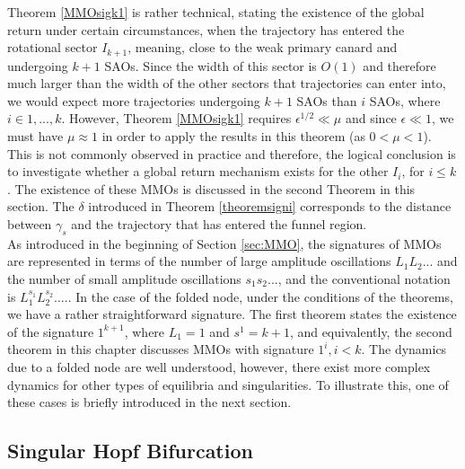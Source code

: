 Theorem \ref{MMOsigk1} is rather technical, stating the existence of the global return under certain circumstances, when the trajectory has entered the rotational sector $I_{k+1}$, meaning, close to the weak primary canard and undergoing $k+1$ SAOs. Since the width of this sector is $O(1)$ and therefore much larger than the width of the other sectors that trajectories can enter into, we would expect more trajectories undergoing $k+1$ SAOs than $i$ SAOs, where $i \in 1,...,k$.
However, Theorem \ref{MMOsigk1} requires $\epsilon^{1/2} \ll \mu$ and since $\epsilon \ll 1$, we must have $\mu \approx 1$ in order to apply the results in this theorem (as $0<\mu<1$). This is not commonly observed in practice and therefore, the logical conclusion is to investigate whether a global return mechanism exists for the other $I_i$, for $i \leq k$. The existence of these MMOs is discussed in the second Theorem in this section. The $\delta$ introduced in Theorem \ref{theoremsigni} corresponds to the distance between
$\gamma_s$ and the trajectory that has entered the funnel region.\\

As introduced in the beginning of Section \ref{sec:MMO},  the signatures of MMOs are represented in terms of the number of large amplitude oscillations $L_1L_2...$ and the number of small amplitude oscillations $s_1s_2...$, and the conventional notation is $L_1^{s_1}L_2^{s_2}....$.
In the case of the folded node, under the conditions of the theorems, we have a rather straightforward signature. The first theorem states the existence of the signature $1^{k+1}$, where $L_1=1$ and $s^1=k+1$, and equivalently, the second theorem in this chapter discusses MMOs with signature $1^{i}, i<k$.
The dynamics due to a folded node are well understood, however, there exist more complex dynamics for other types of equilibria and singularities.
To illustrate this, one of these cases is briefly introduced in the next section.


\subsection{Singular Hopf Bifurcation}


